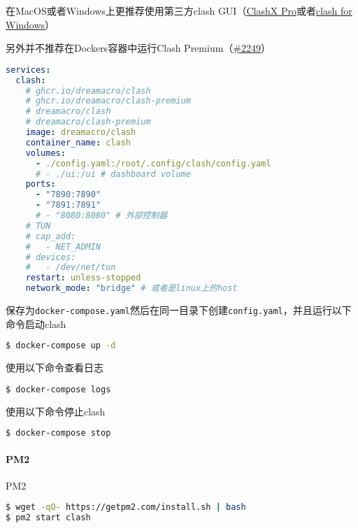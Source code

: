 在MacOS或者Windows上更推荐使用第三方clash GUI（\href{https://install.appcenter.ms/users/clashx/apps/clashx-pro/distribution_groups/public}{ClashX Pro}或者\href{https://github.com/Fndroid/clash_for_windows_pkg}{clash for Windows}）

另外并不推荐在Dockers容器中运行Clash Premium（\href{https://github.com/Dreamacro/clash/issues/2249#issuecomment-1203494599}{\#2249}）
\begin{lstlisting}[breaklines=true,language=yaml,style=yaml]
services:
  clash:
    # ghcr.io/dreamacro/clash
    # ghcr.io/dreamacro/clash-premium
    # dreamacro/clash
    # dreamacro/clash-premium
    image: dreamacro/clash
    container_name: clash
    volumes:
      - ./config.yaml:/root/.config/clash/config.yaml
      # - ./ui:/ui # dashboard volume
    ports:
      - "7890:7890"
      - "7891:7891"
      # - "8080:8080" # 外部控制器
    # TUN
    # cap_add:
    #   - NET_ADMIN
    # devices:
    #   - /dev/net/tun
    restart: unless-stopped
    network_mode: "bridge" # 或者是linux上的host
\end{lstlisting}

保存为\verb|docker-compose.yaml|然后在同一目录下创建\verb|config.yaml|，并且运行以下命令启动clash
\begin{lstlisting}[breaklines=true,language=sh]
$ docker-compose up -d
\end{lstlisting}
使用以下命令查看日志
\begin{lstlisting}[breaklines=true,language=sh]
$ docker-compose logs
\end{lstlisting}
使用以下命令停止clash
\begin{lstlisting}[breaklines=true,language=sh]
$ docker-compose stop
\end{lstlisting}

\paragraph{PM2} PM2

\begin{lstlisting}[breaklines=true,language=sh]
$ wget -qO- https://getpm2.com/install.sh | bash
$ pm2 start clash
\end{lstlisting}